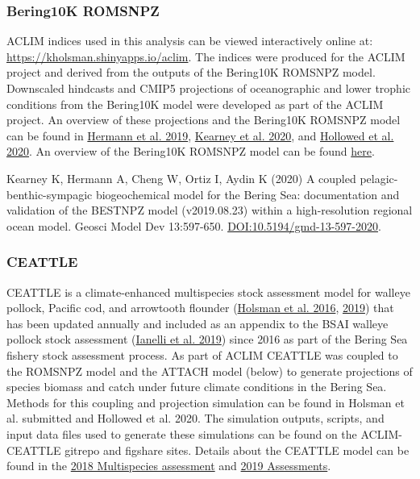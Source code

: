 \documentclass[]{article}
\begin{document}
\subsubsection{Bering10K ROMSNPZ}\label{bering10k-romsnpz}

ACLIM indices used in this analysis can be viewed interactively online
at: \url{https://kholsman.shinyapps.io/aclim}. The indices were produced
for the ACLIM project and derived from the outputs of the Bering10K
ROMSNPZ model. Downscaled hindcasts and CMIP5 projections of
oceanographic and lower trophic conditions from the Bering10K model were
developed as part of the ACLIM project. An overview of these projections
and the Bering10K ROMSNPZ model can be found in
\href{\%22https://academic.oup.com/icesjms/article/76/5/1280/5477847\%22}{Hermann
et al. 2019},
\href{\%22https://gmd.copernicus.org/articles/13/597/2020/\%22}{Kearney
et al. 2020}, and
\href{\%22https://www.frontiersin.org/articles/10.3389/fmars.2019.00775/full\%22}{Hollowed
et al. 2020}. An overview of the Bering10K ROMSNPZ model can be found
\href{\%22https://beringnpz.github.io/roms-bering-sea/intro/\%22}{here}.

Kearney K, Hermann A, Cheng W, Ortiz I, Aydin K (2020) A coupled
pelagic-benthic-sympagic biogeochemical model for the Bering Sea:
documentation and validation of the BESTNPZ model (v2019.08.23) within a
high-resolution regional ocean model. Geosci Model Dev 13:597-650.
\url{DOI:10.5194/gmd-13-597-2020}.

\subsubsection{CEATTLE}\label{ceattle}

CEATTLE is a climate-enhanced multispecies stock assessment model for
walleye pollock, Pacific cod, and arrowtooth flounder
(\href{\%22https://www.sciencedirect.com/science/article/pii/S0967064515002751\%22}{Holsman
et al. 2016},
\href{\%22https://archive.afsc.noaa.gov/refm/docs/2019/EBSmultispp.pdf\%22}{2019})
that has been updated annually and included as an appendix to the BSAI
walleye pollock stock assessment
(\href{\%22https://archive.afsc.noaa.gov/refm/docs/2019/GOApollock.pdf\%22}{Ianelli
et al. 2019}) since 2016 as part of the Bering Sea fishery stock
assessment process. As part of ACLIM CEATTLE was coupled to the ROMSNPZ
model and the ATTACH model (below) to generate projections of species
biomass and catch under future climate conditions in the Bering Sea.
Methods for this coupling and projection simulation can be found in
Holsman et al. submitted and Hollowed et al. 2020. The simulation
outputs, scripts, and input data files used to generate these
simulations can be found on the ACLIM-CEATTLE gitrepo and figshare
sites. Details about the CEATTLE model can be found in the
\href{\%22https://archive.fisheries.noaa.gov/afsc/REFM/Docs/2018/BSAI/2018EBSmultispp-508.pdf\%22}{2018
Multispecies assessment} and
\href{\%22https://archive.afsc.noaa.gov/refm/docs/2019/EBSmultispp.pdf\%22}{2019
Assessments}.
\end{document}
